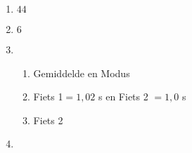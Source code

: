 {\begin{multicols}{3}
\begin{enumerate}[noitemsep, label=\textbf{\arabic*}.]
  \item $44$ %

  \item $6$%

  \item %

    
\begin{enumerate}[noitemsep, label=\textbf{(\alph*)} ]
    \item Gemiddelde en Modus %
    \item Fiets 1$ = 1,02$ s en Fiets 2 $ =1,0$ s%
    \item Fiets 2%
    \end{enumerate}

  \item %


\end{enumerate}
\end{multicols}}
